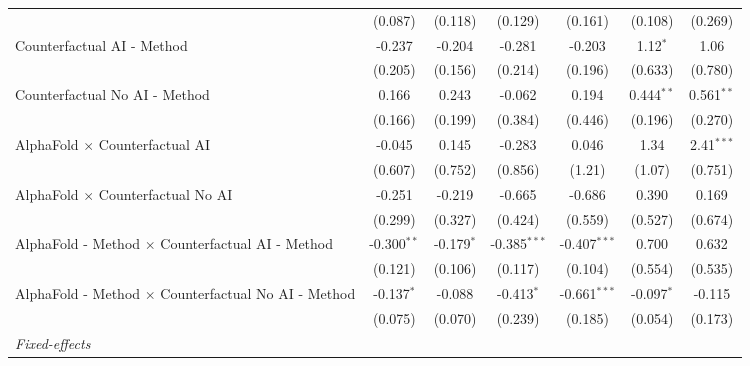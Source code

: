 \begin{tabular}{lcccccc}
                                                              & (0.087)       & (0.118)      & (0.129)        & (0.161)        & (0.108)       & (0.269)\\   
   Counterfactual AI - Method                                 & -0.237        & -0.204       & -0.281         & -0.203         & 1.12$^{*}$    & 1.06\\   
                                                              & (0.205)       & (0.156)      & (0.214)        & (0.196)        & (0.633)       & (0.780)\\   
   Counterfactual No AI - Method                              & 0.166         & 0.243        & -0.062         & 0.194          & 0.444$^{**}$  & 0.561$^{**}$\\   
                                                              & (0.166)       & (0.199)      & (0.384)        & (0.446)        & (0.196)       & (0.270)\\   
   AlphaFold $\times$ Counterfactual AI                       & -0.045        & 0.145        & -0.283         & 0.046          & 1.34          & 2.41$^{***}$\\   
                                                              & (0.607)       & (0.752)      & (0.856)        & (1.21)         & (1.07)        & (0.751)\\   
   AlphaFold $\times$ Counterfactual No AI                    & -0.251        & -0.219       & -0.665         & -0.686         & 0.390         & 0.169\\   
                                                              & (0.299)       & (0.327)      & (0.424)        & (0.559)        & (0.527)       & (0.674)\\   
   AlphaFold - Method $\times$ Counterfactual AI - Method     & -0.300$^{**}$ & -0.179$^{*}$ & -0.385$^{***}$ & -0.407$^{***}$ & 0.700         & 0.632\\   
                                                              & (0.121)       & (0.106)      & (0.117)        & (0.104)        & (0.554)       & (0.535)\\   
   AlphaFold - Method $\times$ Counterfactual No AI - Method  & -0.137$^{*}$  & -0.088       & -0.413$^{*}$   & -0.661$^{***}$ & -0.097$^{*}$  & -0.115\\   
                                                              & (0.075)       & (0.070)      & (0.239)        & (0.185)        & (0.054)       & (0.173)\\   
   \midrule
   \emph{Fixed-effects}\\

\end{tabular}
